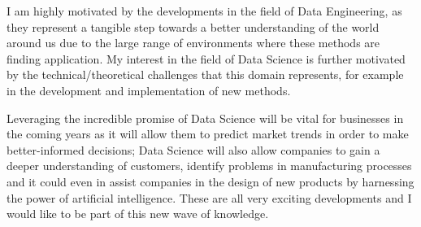\documentclass[11pt, a4paper]{awesome-cv}
\begin{document}
\begin{cvletter}
I am highly motivated by the developments in the field of Data Engineering, as they represent a tangible step towards a better understanding of the world around us due to the large range of environments where these methods are finding application. My interest in the field of Data Science is further motivated by the technical/theoretical challenges that this domain represents, for example in the development and implementation of new methods. 

Leveraging the incredible promise of Data Science will be vital for businesses in the coming years as it will allow them to predict market trends in order to make better-informed decisions; Data Science will also allow companies to gain a deeper understanding of customers, identify problems in manufacturing processes and it could even in assist companies in the design of new products by harnessing the power of artificial intelligence. These are all very exciting developments and I would like to be part of this new wave of knowledge. 

\end{cvletter}

\makeletterclosing
\end{document}
